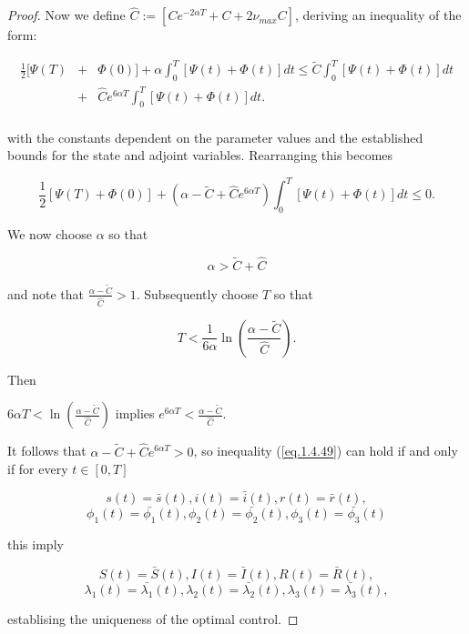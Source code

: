 \begin{proof}
Now we define $\hat{C}:=[Ce^{-2\alpha T}+C+2\nu_{max}C]$, deriving an inequality of the form:

\begin{eqnarray*}
	\frac{1}{2}[\Psi(T)&+&\Phi(0)]+\alpha\int_{0}^{T}[\Psi(t)+\Phi(t)]dt	\leq \tilde{C}\int_{0}^{T}[\Psi(t)+\Phi(t)]dt\\
	&+&\hat{C}e^{6\alpha T}\int_{0}^{T}[\Psi(t)+\Phi(t)]dt.\\	
\end{eqnarray*}

with the constants dependent on the parameter values and the established bounds for the state and adjoint variables. Rearranging this becomes

\begin{equation}\label{eq.1.4.49}
\frac{1}{2}[\Psi(T)+\Phi(0)]+(\alpha-\tilde{C}+\hat{C}e^{6\alpha T})\int_{0}^{T}[\Psi(t)+\Phi(t)]dt\leq 0.
\end{equation}

We now choose $\alpha$ so that 

$$\alpha>\tilde{C}+\hat{C}$$

and note that $\frac{\alpha-\tilde{C}}{\hat{C}}>1$. Subsequently choose $T$ so that 

$$T<\frac{1}{6\alpha}\ln\left(\frac{\alpha-\tilde{C}}{\hat{C}}\right).$$

Then

$6\alpha T<\ln\left(\frac{\alpha-\tilde{C}}{\hat{C}}\right)$ implies $e^{6\alpha T}<\frac{\alpha-\tilde{C}}{\hat{C}}$.

It follows that $\alpha-\tilde{C}+\hat{C}e^{6\alpha T}>0$, so inequality (\ref{eq.1.4.49}) can hold if and only if for every $t\in [0,T]$

$$s(t)=\bar{s}(t),i(t)=\bar{i}(t),r(t)=\bar{r}(t),$$
$$\phi_1(t)=\bar{\phi_1}(t),\phi_2(t)=\bar{\phi_2}(t),\phi_3(t)=\bar{\phi_3}(t)$$

this imply

$$S(t)=\bar{S}(t),I(t)=\bar{I}(t),R(t)=\bar{R}(t),$$
$$\lambda_1(t)=\bar{\lambda_1}(t),\lambda_2(t)=\bar{\lambda_2}(t),\lambda_3(t)=\bar{\lambda_3}(t),$$

establising the uniqueness of the optimal control.
\end{proof}


